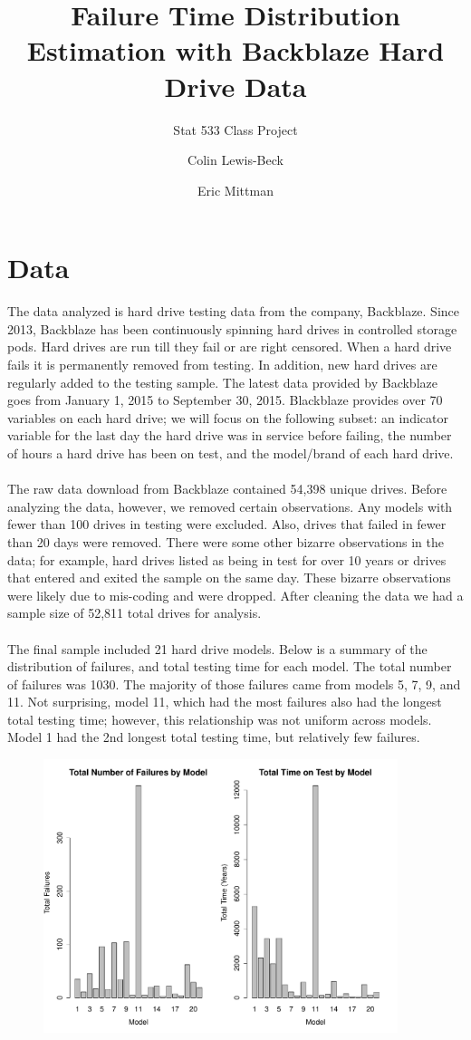 \documentclass{scrartcl}
\title{Failure Time Distribution Estimation with Backblaze Hard Drive Data}
\subtitle{Stat 533 Class Project}
\author{Colin Lewis-Beck\\
  \and
  Eric Mittman}
\begin{document}
\noindent
\maketitle
\section*{Data}
The data analyzed is hard drive testing data from the company, Backblaze.  Since 2013, Backblaze has been continuously spinning hard drives in controlled storage pods.  Hard drives are run till they fail or are right censored.  When a hard drive fails it is permanently removed from testing.  In addition, new hard drives are regularly added to the testing sample.  The latest data provided by Backblaze goes from January 1, 2015 to September 30, 2015.  Blackblaze provides over 70 variables on each hard drive; we will focus on the following subset: an indicator variable for the last day the hard drive was in service before failing, the number of hours a hard drive has been on test, and the model/brand of each hard drive.\\\\
The raw data download from Backblaze contained 54,398 unique drives.  Before analyzing the data, however, we removed certain observations.  Any models with fewer than 100 drives in testing were excluded.  Also, drives that failed in fewer than 20 days were removed.  There were some other bizarre observations in the data; for example, hard drives listed as being in test for over 10 years or drives that entered and exited the sample on the same day.  These bizarre observations were likely due to mis-coding and were dropped.  After cleaning the data we had a sample size of 52,811 total drives for analysis.\\\\
The final sample included 21 hard drive models.  Below is a summary of the distribution of failures, and total testing time for each model.  The total number of failures was 1030.  The majority of those failures came from models 5, 7, 9, and 11.  Not surprising, model 11, which had the most failures also had the longest total testing time; however, this relationship was not uniform across models.  Model 1 had the 2nd longest total testing time, but relatively few failures.
\begin{figure}[H]
\centering
\includegraphics[height=8cm]{sumstat1.pdf}
\end{figure}
\end{document}
